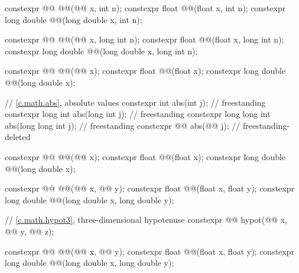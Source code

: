 \begin{codeblock}
{  constexpr @@ @@(@@ x, int n);
  constexpr float               @@(float x, int n);
  constexpr long double         @@(long double x, int n);

  constexpr @@ @@(@@ x, long int n);
  constexpr float               @@(float x, long int n);
  constexpr long double         @@(long double x, long int n);

  constexpr @@ @@(@@ x);
  constexpr float               @@(float x);
  constexpr long double         @@(long double x);

  // \ref{c.math.abs}, absolute values
  constexpr int                 abs(int j);                             // freestanding
  constexpr long int            abs(long int j);                        // freestanding
  constexpr long long int       abs(long long int j);                   // freestanding
  constexpr @@ abs(@@ j);             // freestanding-deleted

  constexpr @@ @@(@@ x);
  constexpr float               @@(float x);
  constexpr long double         @@(long double x);

  constexpr @@ @@(@@ x, @@ y);
  constexpr float               @@(float x, float y);
  constexpr long double         @@(long double x, long double y);

  // \ref{c.math.hypot3}, three-dimensional hypotenuse
  constexpr @@ hypot(@@ x, @@ y,
                                      @@ z);

  constexpr @@ @@(@@ x, @@ y);
  constexpr float               @@(float x, float y);
  constexpr long double         @@(long double x, long double y);

}
\end{codeblock}
